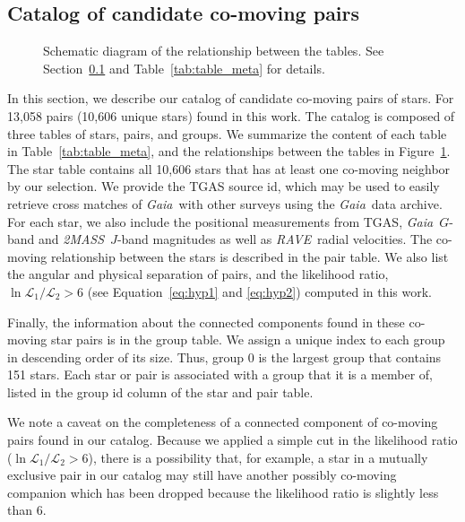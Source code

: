 \documentclass[manuscript, letterpaper]{aastex6}
\newcommand{\project}[1]{\textsl{#1}}
\newcommand{\acronym}[1]{{\small{#1}}}
\newcommand{\gaia}{\project{Gaia}}
\newcommand{\rave}{\project{\acronym{RAVE}}}
\newcommand{\tmass}{\project{\acronym{2MASS}}}
\newcommand{\sectionname}{Section}
\newcommand{\eqname}{Equation}
\newcommand{\tgas}{\acronym{TGAS}}
\begin{document}
\subsection{Catalog of candidate co-moving pairs}
\label{sub:catalog}



\begin{figure}[htbp]
  \centering
  
  \caption{Schematic diagram of the relationship between the tables.
    See \sectionname~\ref{sub:catalog} and Table~\ref{tab:table_meta} for details.
    \label{fig:schema}}
\end{figure}

In this section, we describe our catalog of candidate co-moving pairs of stars.
For 13,058 pairs (10,606 unique stars) found in this work.
The catalog is composed of three tables of stars, pairs, and groups.
We summarize the content of each table in Table~\ref{tab:table_meta}, and
the relationships between the tables in Figure~\ref{fig:schema}.
The star table contains all 10,606 stars that has at least one co-moving neighbor
by our selection. We provide the TGAS source id, which may be used to easily
retrieve cross matches of \gaia\ with other surveys
using the \gaia\ data archive.
For each star, we also include the positional measurements from \tgas,
\gaia\ $G$-band and \tmass\ $J$-band magnitudes as well as
\rave\ radial velocities.
The co-moving relationship between the stars is described in the pair table.
We also list the angular and physical separation of pairs, and the likelihood ratio,
$\ln \mathcal{L}_1 /\mathcal{L}_2>6$ (see \eqname~\ref{eq:hyp1} and \ref{eq:hyp2})
computed in this work.

Finally, the information about the connected components found in these co-moving
star pairs is in the group table. We assign a unique index to each group
in descending order of its size. Thus, group 0 is the largest group
that contains 151 stars.
Each star or pair is associated with a group that it is a member of, listed
in the group id column of the star and pair table.

We note a caveat on the completeness of a connected component of co-moving
pairs found in our catalog. Because we applied a simple cut in the likelihood
ratio ($\ln \mathcal{L}_1 /\mathcal{L}_2>6$), there is a possibility that, for
example, a star in a mutually exclusive pair in our catalog may still have
another possibly co-moving companion which has been dropped because the
likelihood ratio is slightly less than 6.
\end{document}

